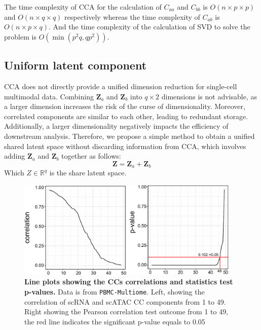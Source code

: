 The time complexity of CCA for the calculation of $C_{aa}$ and $C_{bb}$ is $O(n\times p \times p)$ and $O(n\times q \times q)$ respectively whereas the time complexity of $C_{ab}$ is $O(n\times p \times q)$. And the time complexity of the calculation of SVD to solve the problem is $O(\min(p^2q,qp^2))$.

\subsection{Uniform latent component}
CCA does not directly provide a unified dimension reduction for single-cell multimodal data. Combining $\mathbf{Z}_a$ and $\mathbf{Z}_b$ into $q\times 2$ dimensions is not advisable, as a larger dimension increases the risk of the curse of dimensionality. Moreover, correlated components are similar to each other, leading to redundant storage. Additionally, a larger dimensionality negatively impacts the efficiency of downstream analysis. Therefore, we propose a simple method to obtain a unified shared latent space without discarding information from CCA, which involves adding $\mathbf{Z}_a$ and $\mathbf{Z}_b$ together as follows:
\begin{equation}
    \mathbf{Z} = \mathbf{Z}_a + \mathbf{Z}_b
\end{equation}
Which $Z\in \mathbb{R}^{q}$ is the share latent space.

\begin{figure}[!ht]
	\centering
	\includegraphics[width=0.95\textwidth]{CC_pval_select/fig}
	\vspace{0.1cm}
	\caption[Line plots showing the CCs correlations and statistics test p-values.]{\textbf{Line plots showing the CCs correlations and statistics test p-values.} Data is from \texttt{PBMC-Multiome}. Left, showing the correlation of scRNA and scATAC CC components from 1 to 49. Right showing the Pearson correlation test outcome from 1 to 49, the red line indicates the significant p-value equals to 0.05}
	\label{fig:CC_pval_select}
\end{figure}

